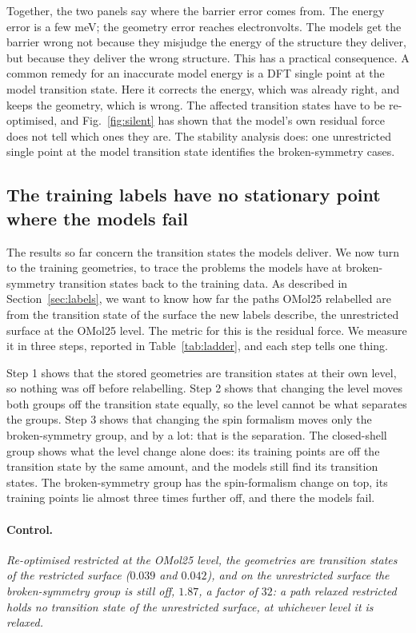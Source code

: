 Together, the two panels say where the barrier error comes from. The energy
error is a few meV; the geometry error reaches electronvolts. The
models get the barrier wrong not because they misjudge the energy of
the structure they deliver, but because they deliver the wrong
structure. This has a practical consequence. A common
remedy for an inaccurate model energy is a DFT single point at the model
transition state. Here it corrects the energy, which was already right, and
keeps the geometry, which is wrong. The affected transition states have to
be re-optimised, and Fig.~\ref{fig:silent} has shown that the model's own
residual force does not tell which ones they are. The stability
analysis does: one unrestricted single point at the model transition
state identifies the broken-symmetry cases.

\subsection{The training labels have no stationary point where the models fail}

The results so far concern the transition states the models deliver.
We now turn to the training geometries, to trace the problems the
models have at broken-symmetry transition states back to the training
data. As described in Section~\ref{sec:labels}, we want to know how
far the paths OMol25 relabelled are from the transition state of the
surface the new labels describe, the unrestricted surface at the
OMol25 level. The metric for this is the residual force. We measure
it in three steps, reported in Table~\ref{tab:ladder}, and each step
tells one thing.

Step 1 shows that the stored geometries are transition states at
their own level, so nothing was off before relabelling. Step 2 shows
that changing the level moves both groups off the transition state
equally, so the level cannot be what separates the groups. Step 3
shows that changing the spin formalism moves only the broken-symmetry
group, and by a lot: that is the separation. The closed-shell group
shows what the level change alone does: its training points are off
the transition state by the same amount, and the models still find
its transition states. The broken-symmetry group has the
spin-formalism change on top, its training points lie almost three
times further off, and there the models fail.

\paragraph{Control.} \emph{Re-optimised restricted at the OMol25 level, the
geometries are transition states of the restricted surface ($0.039$
and $0.042$), and on the unrestricted surface the broken-symmetry group
is still off, $1.87$, a factor of $32$: a path relaxed restricted holds
no transition state of the unrestricted surface, at whichever level it
is relaxed.}

